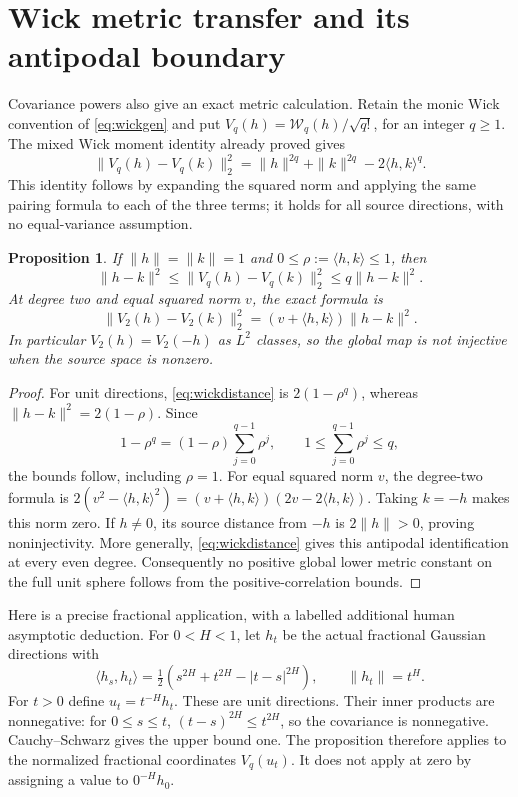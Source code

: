 \documentclass[11pt]{article}
\newtheorem{proposition}[theorem]{Proposition}
\begin{document}
\section{Wick metric transfer and its antipodal boundary}\label{sec:wickmetric}
Covariance powers also give an exact metric calculation. Retain the
monic Wick convention of \eqref{eq:wickgen} and put
$V_q(h)=\mathcal W_q(h)/\sqrt{q!}$, for an integer $q\geq1$.
The mixed Wick moment identity already proved gives
\begin{equation}\label{eq:wickdistance}
 \|V_q(h)-V_q(k)\|_2^2
 =\|h\|^{2q}+\|k\|^{2q}-2\langle h,k\rangle^q.
\end{equation}
This identity follows by expanding the squared norm and applying the
same pairing formula to each of the three terms; it holds for all
source directions, with no equal-variance assumption.

\begin{proposition}\label{prop:wickmetric}
If $\|h\|=\|k\|=1$ and $0\leq\rho:=\langle h,k\rangle\leq1$, then
\[
 \|h-k\|^2\leq\|V_q(h)-V_q(k)\|_2^2\leq q\|h-k\|^2.
\]
At degree two and equal squared norm $v$, the exact formula is
\[
 \|V_2(h)-V_2(k)\|_2^2
   =(v+\langle h,k\rangle)\|h-k\|^2.
\]
In particular $V_2(h)=V_2(-h)$ as $L^2$ classes, so the global
map is not injective when the source space is nonzero.
\end{proposition}
\begin{proof}
For unit directions, \eqref{eq:wickdistance} is $2(1-\rho^q)$,
whereas $\|h-k\|^2=2(1-\rho)$. Since
\[
 1-\rho^q=(1-\rho)\sum_{j=0}^{q-1}\rho^j,
 \qquad 1\leq\sum_{j=0}^{q-1}\rho^j\leq q,
\]
the bounds follow, including $\rho=1$. For equal squared norm $v$,
the degree-two formula is
$2(v^2-\langle h,k\rangle^2)
 =(v+\langle h,k\rangle)(2v-2\langle h,k\rangle)$.
Taking $k=-h$ makes this norm zero. If $h\ne0$, its source distance
from $-h$ is $2\|h\|>0$, proving noninjectivity. More generally,
\eqref{eq:wickdistance} gives this antipodal identification at every
even degree. Consequently no positive global lower metric constant
on the full unit sphere follows from the positive-correlation bounds.
\end{proof}

Here is a precise fractional application, with a labelled additional
human asymptotic deduction. For $0<H<1$, let $h_t$ be the actual
fractional Gaussian directions with
\[
 \langle h_s,h_t\rangle
 =\tfrac12(s^{2H}+t^{2H}-|t-s|^{2H}),\qquad \|h_t\|=t^H.
\]
For $t>0$ define $u_t=t^{-H}h_t$. These are unit directions. Their
inner products are nonnegative: for $0\leq s\leq t$,
$(t-s)^{2H}\leq t^{2H}$, so the covariance is nonnegative.
Cauchy--Schwarz gives the upper bound one. The proposition therefore
applies to the normalized fractional coordinates $V_q(u_t)$.
It does not apply at zero by assigning a value to $0^{-H}h_0$.
\end{document}
